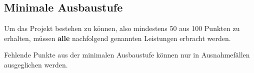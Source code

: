 \subsection{Minimale Ausbaustufe}
\label{sec:minimal}

Um das Projekt bestehen zu k\"onnen, also mindestens 50 aus 100
Punkten zu erhalten, m\"ussen \textbf{alle} nachfolgend genannten Leistungen erbracht werden.

Fehlende Punkte aus der minimalen Ausbaustufe k\"onnen nur in Ausnahmef\"allen ausgeglichen werden.
